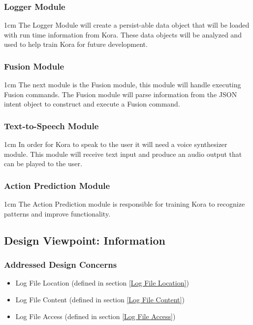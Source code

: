 \documentclass[onecolumn, draftclsnofoot,10pt, compsoc]{IEEEtran}
\def \botname{Kora\xspace}
\newenvironment{indentItem}[1][1cm]{\begin{adjustwidth}{#1}{}}{\end{adjustwidth}}
\newcommand{\designConcernRef}[1]{
    #1 (defined in section \ref{#1})
}
\begin{document}
	\subsubsection{Logger Module}
	\begin{indentItem}
		The Logger Module will create a persist-able data object that will be loaded with run time information from \botname.
		These data objects will be analyzed and used to help train \botname for future development.
	\end{indentItem}
	\subsubsection{Fusion Module}
	\begin{indentItem}
		The next module is the Fusion module, this module will handle executing Fusion commands.
		The Fusion module will parse information from the JSON intent object to construct and execute a Fusion command.
	\end{indentItem}
	\subsubsection{Text-to-Speech Module}
	\begin{indentItem}
		In order for \botname to speak to the user it will need a voice synthesizer module.
		This module will receive text input and produce an audio output that can be played to the user.
	\end{indentItem}
	\subsubsection{Action Prediction Module}
	\begin{indentItem}
		The Action Prediction module is responsible for training \botname to recognize patterns and improve functionality.
	\end{indentItem}

	\subsection{Design Viewpoint: Information}
	\subsubsection{Addressed Design Concerns}
	\begin{itemize}
		\item \designConcernRef{Log File Location}
		\item \designConcernRef{Log File Content}
		\item \designConcernRef{Log File Access}
	\end{itemize}
\end{document}
